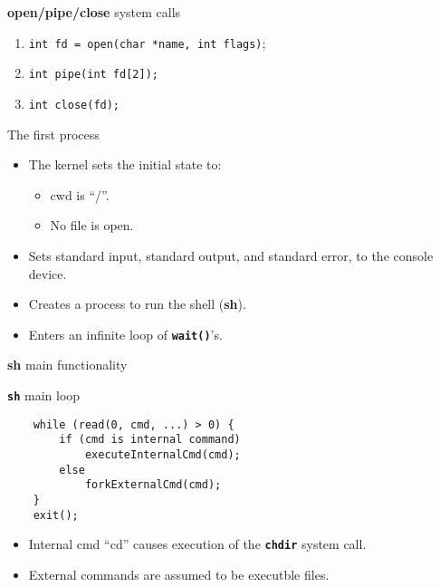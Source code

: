 \maketitle
%
%
%
\lstset{tabsize=1,stepnumber=1000,numberfirstline=true,
										numberstyle=\tiny,xleftmargin=2.5ex}
%
%
%
\begin{frame}{{\bf open/pipe/close} system calls}
\begin{enumerate}
\item
	{\tt  int fd = open(char *name, int flags)};
\item
	{\tt int pipe(int fd[2]);}
\item
	{\tt int close(fd);}
\end{enumerate}
\end{frame}
%
%
%
\begin{frame}{The first process}
\begin{itemize}
\item
	The kernel sets the initial state to:
	\begin{itemize}
		\item
				cwd is ``/''.
		\item
			No file is open.
	\end{itemize}
\item
	Sets standard input, standard output, and standard error, to the console device.
\item
	Creates a process to run the shell ({\bf sh}).
\item
	Enters an infinite loop of {\tt \bf wait()}'s.
\end{itemize}
\end{frame}
%
%
%
%
\begin{frame}{}
\vfill
\begin{center}
{\Large
{\bf sh} main functionality \\}
\end{center}
\vfill
\end{frame}
%
%
\begin{frame}[fragile]{{\tt \bf sh} main loop}
\begin{lstlisting}
	while (read(0, cmd, ...) > 0) {
		if (cmd is internal command)
			executeInternalCmd(cmd);
		else
			forkExternalCmd(cmd);
	}
	exit();
\end{lstlisting}
\begin{itemize}
\item
	Internal cmd ``cd'' causes execution of the {\bf \tt chdir} system call.
\item
	External commands are assumed to be executble files.
\end{itemize}
\end{frame}
